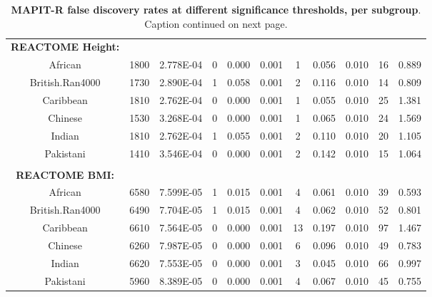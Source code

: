 \documentclass[12pt,a4paper]{article}
\begin{document}
\begin{landscape}
\begin{table}[ht]
\begin{tabular}{ccccccccccc}
  \textbf{REACTOME Height:} & & & & & & & & & \\
  African & 1800 & 2.778E-04 & 0 & 0.000 & 0.001 & 1 & 0.056 & 0.010 & 16 & 0.889 \\
  British.Ran4000 & 1730 & 2.890E-04 & 1 & 0.058 & 0.001 & 2 & 0.116 & 0.010 & 14 & 0.809 \\
  Caribbean & 1810 & 2.762E-04 & 0 & 0.000 & 0.001 & 1 & 0.055 & 0.010 & 25 & 1.381 \\
  Chinese & 1530 & 3.268E-04 & 0 & 0.000 & 0.001 & 1 & 0.065 & 0.010 & 24 & 1.569 \\
  Indian & 1810 & 2.762E-04 & 1 & 0.055 & 0.001 & 2 & 0.110 & 0.010 & 20 & 1.105 \\
  Pakistani & 1410 & 3.546E-04 & 0 & 0.000 & 0.001 & 2 & 0.142 & 0.010 & 15 & 1.064 \\
  \\
  \textbf{REACTOME BMI:} & & & & & & & & & \\
African & 6580 & 7.599E-05 & 1 & 0.015 & 0.001 & 4 & 0.061 & 0.010 & 39 & 0.593 \\
  British.Ran4000 & 6490 & 7.704E-05 & 1 & 0.015 & 0.001 & 4 & 0.062 & 0.010 & 52 & 0.801 \\
  Caribbean & 6610 & 7.564E-05 & 0 & 0.000 & 0.001 & 13 & 0.197 & 0.010 & 97 & 1.467 \\
  Chinese & 6260 & 7.987E-05 & 0 & 0.000 & 0.001 & 6 & 0.096 & 0.010 & 49 & 0.783 \\
  Indian & 6620 & 7.553E-05 & 0 & 0.000 & 0.001 & 3 & 0.045 & 0.010 & 66 & 0.997 \\
  Pakistani & 5960 & 8.389E-05 & 0 & 0.000 & 0.001 & 4 & 0.067 & 0.010 & 45 & 0.755 \\
   \hline
\end{tabular}
\caption[TBD]{\textbf{MAPIT-R false discovery rates at different significance thresholds, per subgroup}. Caption continued on next page. }
\label{InterPath-Supp-Table-AllPops-FDRs}
\end{table}
\end{landscape}
\clearpage
\setlength{\footskip}{1cm}
\end{document}
